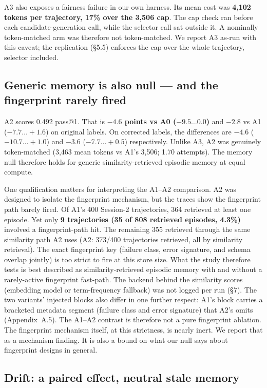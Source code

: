 \documentclass[sigconf, nonacm]{acmart}
\begin{document}
A3 also exposes a fairness failure in our own harness. Its mean cost was \textbf{4,102 tokens per trajectory, 17\% over the 3,506 cap}. The cap check ran before each candidate-generation call, while the selector call sat outside it. A nominally token-matched arm was therefore not token-matched. We report A3 as-run with this caveat; the replication (\S5.5) enforces the cap over the whole trajectory, selector included.

\subsection{Generic memory is also null --- and the fingerprint rarely fired}

A2 scores 0.492 pass@1. That is \textbf{$-4.6$ points vs A0 ($-9.5\ldots0.0$)} and $-2.8$ vs A1 ($-7.7\ldots+1.6$) on original labels. On corrected labels, the differences are $-4.6$ ($-10.7\ldots+1.0$) and $-3.6$ ($-7.7\ldots+0.5$) respectively. Unlike A3, A2 was genuinely token-matched (3,463 mean tokens vs A1's 3,506; 1.70 attempts). The memory null therefore holds for generic similarity-retrieved episodic memory at equal compute.

One qualification matters for interpreting the A1--A2 comparison. A2 was designed to isolate the fingerprint mechanism, but the traces show the fingerprint path barely fired. Of A1's 400 Session-2 trajectories, 364 retrieved at least one episode. Yet only \textbf{9 trajectories (35 of 808 retrieved episodes, 4.3\%)} involved a fingerprint-path hit. The remaining 355 retrieved through the same similarity path A2 uses (A2: 373/400 trajectories retrieved, all by similarity retrieval). The exact fingerprint key (failure class, error signature, and schema overlap jointly) is too strict to fire at this store size. What the study therefore tests is best described as similarity-retrieved episodic memory with and without a rarely-active fingerprint fast-path. The backend behind the similarity scores (embedding model or term-frequency fallback) was not logged per run (\S7). The two variants' injected blocks also differ in one further respect: A1's block carries a bracketed metadata segment (failure class and error signature) that A2's omits (Appendix~A.5). The A1--A2 contrast is therefore not a pure fingerprint ablation. The fingerprint mechanism itself, at this strictness, is nearly inert. We report that as a mechanism finding. It is also a bound on what our null says about fingerprint designs in general.

\subsection{Drift: a paired effect, neutral stale memory}
\end{document}
